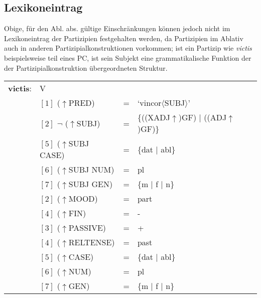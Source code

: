 \documentclass[12pt,a4paper]{article}
\begin{document}
\subsection{Lexikoneintrag}
Obige, für den Abl. abs. gültige Einschränkungen können jedoch nicht im Lexikoneintrag der Partizipien festgehalten werden, da Partizipien im Ablativ auch in anderen Partizipialkonstruktionen vorkommen; ist ein Partizip wie \textit{victis} beispielsweise teil eines PC, ist sein Subjekt eine grammatikalische Funktion der der Partizipialkonstruktion übergeordneten Struktur.
\begin{singlespace}
\begin{tabular}{ l  l  l  l  } 
\textbf{victis}: & V \\
$\qquad$ & $[1]$ \:  ($\uparrow$PRED) & = & `vincor$\langle$SUBJ$\rangle$'\\
$\qquad$ & $[2]$ \: $\neg$ ($\uparrow$SUBJ) & = & \{((XADJ$\uparrow$)GF) $\mid$ ((ADJ$\uparrow$)GF)\} \\
$\qquad$ & $[5]$ \: ($\uparrow$SUBJ CASE) & = & \{dat $\mid$ abl\} \\
$\qquad$ & $[6]$ \:  ($\uparrow$SUBJ NUM) & = & pl \\
$\qquad$ & $[7]$ \: ($\uparrow$SUBJ GEN) & = & \{m $\mid$ f $\mid$ n\} \\
$\qquad$ & $[2]$ \:  ($\uparrow$MOOD) & = & part\\
$\qquad$ & $[4]$ \:  ($\uparrow$FIN) & = & - \\
$\qquad$ & $[3]$ \: ($\uparrow$PASSIVE) & = & + \\
$\qquad$ & $[4]$ \: ($\uparrow$RELTENSE) & = & past \\
$\qquad$ & $[5]$ \: ($\uparrow$CASE) & = & \{dat $\mid$ abl\} \\
$\qquad$ & $[6]$ \:  ($\uparrow$NUM) & = & pl \\
$\qquad$ & $[7]$ \: ($\uparrow$GEN) & = & \{m $\mid$ f $\mid$ n\} \\
\end{tabular}
\end{singlespace}
\end{document}
